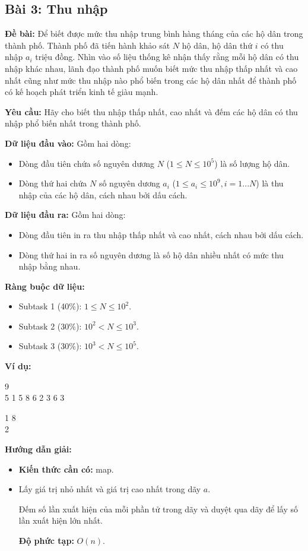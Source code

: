 \documentclass[12pt]{scrartcl}  %
\begin{document}
\subsection{Bài 3: Thu nhập}
\textbf{Đề bài:}
Để biết được mức thu nhập trung bình hàng tháng của các hộ dân trong thành phố. Thành phố đã tiến hành khảo sát $N$ hộ dân, hộ dân thứ $i$ có thu nhập $a_i$ triệu đồng. Nhìn vào số liệu thống kê nhận thấy rằng mỗi hộ dân có thu nhập khác nhau, lãnh đạo thành phố muốn biết mức thu nhập thấp nhất và cao nhất cũng như mức thu nhập nào phổ biến trong các hộ dân nhất để thành phố có kế hoạch phát triển kinh tế giàu mạnh.

\textbf{Yêu cầu:}
Hãy cho biết thu nhập thấp nhất, cao nhất và đếm các hộ dân có thu nhập phổ biến nhất trong thành phố.

\textbf{Dữ liệu đầu vào:}
Gồm hai dòng:
\begin{itemize}
    \item Dòng đầu tiên chứa số nguyên dương $N$ ($1 \leq N \leq 10^5$) là số lượng hộ dân.
    \item Dòng thứ hai chứa $N$ số nguyên dương $a_i$ ($1 \leq a_i \leq 10^9, i = 1 ... N$) là thu nhập của các hộ dân, cách nhau bởi dấu cách.
\end{itemize}

\textbf{Dữ liệu đầu ra:}
Gồm hai dòng:

\begin{itemize}
    \item Dòng đầu tiên in ra thu nhập thấp nhất và cao nhất, cách nhau bởi dấu cách.
    \item Dòng thứ hai in ra số nguyên dương là số hộ dân nhiều nhất có mức thu nhập bằng nhau.
\end{itemize}

\textbf{Ràng buộc dữ liệu:}
\begin{itemize}
    \item Subtask 1 (40\%): $1 \leq N \leq 10^2$.
    \item Subtask 2 (30\%): $10^2 < N \leq 10^3$.
    \item Subtask 3 (30\%): $10^3 < N \leq 10^5$.
\end{itemize}

\textbf{Ví dụ:}
\begin{tcolorbox}[colback=gray!5!white, colframe=blue!50!black, title=Input]
9\\
5 1 5 8 6 2 3 6 3
\end{tcolorbox}
\begin{tcolorbox}[colback=gray!5!white, colframe=green!50!black, title=Output]
1 8\\
2
\end{tcolorbox}
\textbf{Hướng dẫn giải:}
\begin{itemize}
    \item \textbf{Kiến thức cần có:} map.
    \item Lấy giá trị nhỏ nhất và giá trị cao nhất trong dãy $a$.
    
    
    Đếm số lần xuất hiện của mỗi phần tử trong dãy và duyệt qua dãy để lấy số lần xuất hiện lớn nhất.
    
    \textbf{Độ phức tạp:} $O(n)$.
\end{itemize}
\end{document}
